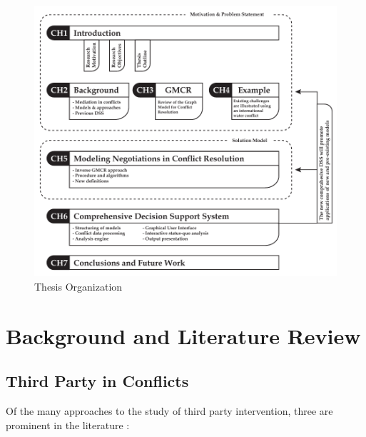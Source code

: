 \documentclass[letterpaper,12pt,titlepage,oneside,final]{book}
\begin{document}
\begin{center}
\begin{figure}[h!]
\centering
\includegraphics[scale=1]{PDF-IMG/Thesis_Outline.pdf}

\caption{Thesis Organization}

\label{fig:proposal}
\end{figure}
\end{center}





\chapter{Background and Literature Review}
\label{sec:Background}



\section{Third Party in Conflicts}


Of the many approaches to the study of third party intervention, three are prominent in the literature \citep{bercovitch2009} :
\end{document}
